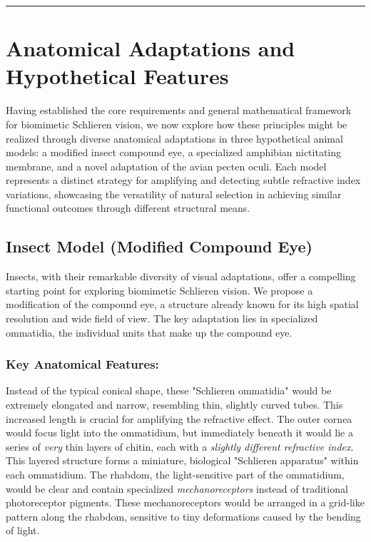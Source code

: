 \documentclass[11pt]{article}
\begin{document}
\bigskip\noindent\rule{\linewidth}{0.4pt}\bigskip

\section{Anatomical Adaptations and Hypothetical Features}

Having established the core requirements and general mathematical framework for biomimetic Schlieren vision, we now explore how these principles might be realized through diverse anatomical adaptations in three hypothetical animal models: a modified insect compound eye, a specialized amphibian nictitating membrane, and a novel adaptation of the avian pecten oculi. Each model represents a distinct strategy for amplifying and detecting subtle refractive index variations, showcasing the versatility of natural selection in achieving similar functional outcomes through different structural means.

\subsection{Insect Model (Modified Compound Eye)}

Insects, with their remarkable diversity of visual adaptations, offer a compelling starting point for exploring biomimetic Schlieren vision. We propose a modification of the compound eye, a structure already known for its high spatial resolution and wide field of view. The key adaptation lies in specialized ommatidia, the individual units that make up the compound eye.

\subsubsection{Key Anatomical Features:}
Instead of the typical conical shape, these "Schlieren ommatidia" would be extremely elongated and narrow, resembling thin, slightly curved tubes. This increased length is crucial for amplifying the refractive effect. The outer cornea would focus light into the ommatidium, but immediately beneath it would lie a series of \textit{very} thin layers of chitin, each with a \textit{slightly different refractive index}. This layered structure forms a miniature, biological "Schlieren apparatus" within each ommatidium. The rhabdom, the light-sensitive part of the ommatidium, would be clear and contain specialized \textit{mechanoreceptors} instead of traditional photoreceptor pigments. These mechanoreceptors would be arranged in a grid-like pattern along the rhabdom, sensitive to tiny deformations caused by the bending of light.
\end{document}
